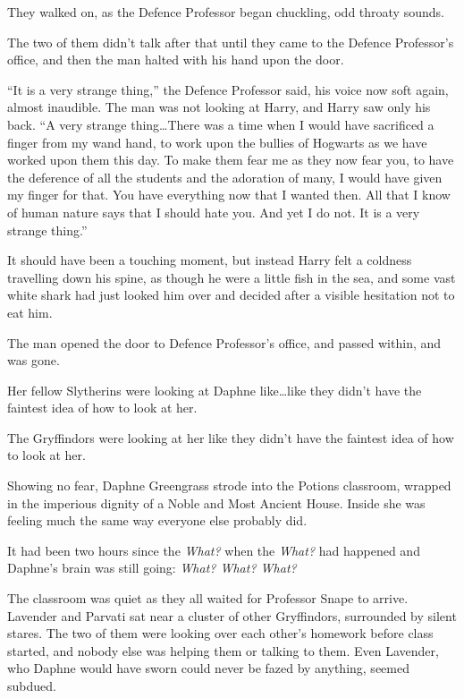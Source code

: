 They walked on, as the Defence Professor began chuckling, odd throaty sounds.

The two of them didn’t talk after that until they came to the Defence Professor’s office, and then the man halted with his hand upon the door.

“It is a very strange thing,” the Defence Professor said, his voice now soft again, almost inaudible. The man was not looking at Harry, and Harry saw only his back. “A very strange thing…There was a time when I would have sacrificed a finger from my wand hand, to work upon the bullies of Hogwarts as we have worked upon them this day. To make them fear me as they now fear you, to have the deference of all the students and the adoration of many, I would have given my finger for that. You have everything now that I wanted then. All that I know of human nature says that I should hate you. And yet I do not. It is a very strange thing.”

It should have been a touching moment, but instead Harry felt a coldness travelling down his spine, as though he were a little fish in the sea, and some vast white shark had just looked him over and decided after a visible hesitation not to eat him.

The man opened the door to Defence Professor’s office, and passed within, and was gone.


Her fellow Slytherins were looking at Daphne like…like they didn’t have the faintest idea of how to look at her.

The Gryffindors were looking at her like they didn’t have the faintest idea of how to look at her.

Showing no fear, Daphne Greengrass strode into the Potions classroom, wrapped in the imperious dignity of a Noble and Most Ancient House. Inside she was feeling much the same way everyone else probably did.

It had been two hours since the \emph{What?} when the \emph{What?} had happened and Daphne’s brain was still going: \emph{What? What? What?}

The classroom was quiet as they all waited for Professor Snape to arrive. Lavender and Parvati sat near a cluster of other Gryffindors, surrounded by silent stares. The two of them were looking over each other’s homework before class started, and nobody else was helping them or talking to them. Even Lavender, who Daphne would have sworn could never be fazed by anything, seemed subdued.

